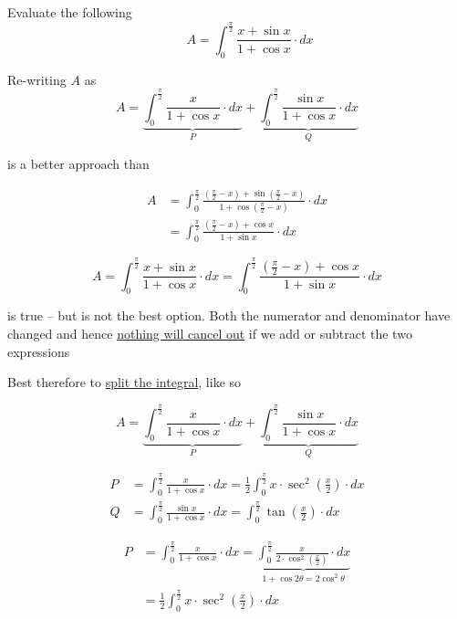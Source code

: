 \documentclass[14pt,fleqn]{extarticle}
\begin{document}
\newcommand\half{\frac{1}{2}}
\newcommand\hpi{\frac{\pi}{2}}
\newcommand\qpi{\frac\pi{4}} 
\newcommand\intg{\int_0^{\hpi}}
\newcommand\hx{\frac{x}{2}}

Evaluate the following \[ \qquad A = \intg\frac{x + \sin x}{1+\cos x}\cdot dx \]
%

\newcard

Re-writing $A$ as  
\small\[ A =  \underbrace{\intg \frac{x}{1+\cos x}\cdot dx}_P + \underbrace{\intg \frac{\sin x}{1+\cos x}\cdot dx}_Q \]\normalsize

is a better approach than 

\begin{align}
	A &= \intg \frac{\left(\hpi - x \right) + \sin \left(\hpi - x \right)}{1+\cos \left(\hpi - x \right)}\cdot dx \\
	&= \intg \frac{\left(\hpi -x \right) + \cos x}{1+ \sin x}\cdot dx 
\end{align}

\newcard 

\small\[ A = \intg \frac{x+\sin x}{1+\cos x}\cdot dx = \intg \frac{\left(\hpi -x \right) + \cos x}{1 + \sin x}\cdot dx \]\normalsize

is true -- but is not the best option. Both the numerator and denominator have changed and hence \underline{nothing will cancel out} if we add or subtract the two expressions\newline 

Best therefore to \underline{split the integral}, like so 

\small\[ A =  \underbrace{\intg \frac{x}{1+\cos x}\cdot dx}_P + \underbrace{\intg \frac{\sin x}{1+\cos x}\cdot dx}_Q \]\normalsize

\newcard 

\begin{align}
P &= \intg \frac{x}{1+\cos x}\cdot dx = \half\intg x\cdot\sec^2 \left(\hx \right)\cdot dx \\
Q &= \intg \frac{\sin x}{1+\cos x}\cdot dx = \intg \tan \left(\hx \right)\cdot dx 
\end{align}

\newcard 

\begin{align}
P &= \intg \frac{x}{1+\cos x}\cdot dx = \underbrace{\intg \frac{x}{2\cdot\cos^2 \left(\hx \right)}\cdot dx}_{1 + \cos 2\theta = 2\cos^2\theta} \\
&= \half\intg x\cdot\sec^2 \left(\hx \right)\cdot dx 
\end{align}\newline 
\end{document}
